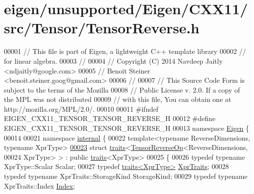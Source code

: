 \hypertarget{eigen_2unsupported_2_eigen_2_c_x_x11_2src_2_tensor_2_tensor_reverse_8h_source}{}\section{eigen/unsupported/\+Eigen/\+C\+X\+X11/src/\+Tensor/\+Tensor\+Reverse.h}
\label{eigen_2unsupported_2_eigen_2_c_x_x11_2src_2_tensor_2_tensor_reverse_8h_source}

\begin{DoxyCode}
00001 \textcolor{comment}{// This file is part of Eigen, a lightweight C++ template library}
00002 \textcolor{comment}{// for linear algebra.}
00003 \textcolor{comment}{//}
00004 \textcolor{comment}{// Copyright (C) 2014 Navdeep Jaitly <ndjaitly@google.com>}
00005 \textcolor{comment}{//                    Benoit Steiner <benoit.steiner.goog@gmail.com>}
00006 \textcolor{comment}{//}
00007 \textcolor{comment}{// This Source Code Form is subject to the terms of the Mozilla}
00008 \textcolor{comment}{// Public License v. 2.0. If a copy of the MPL was not distributed}
00009 \textcolor{comment}{// with this file, You can obtain one at http://mozilla.org/MPL/2.0/.}
00010 
00011 \textcolor{preprocessor}{#ifndef EIGEN\_CXX11\_TENSOR\_TENSOR\_REVERSE\_H}
00012 \textcolor{preprocessor}{#define EIGEN\_CXX11\_TENSOR\_TENSOR\_REVERSE\_H}
00013 \textcolor{keyword}{namespace }\hyperlink{namespace_eigen}{Eigen} \{
00014 
00021 \textcolor{keyword}{namespace }\hyperlink{namespaceinternal}{internal} \{
00022 \textcolor{keyword}{template}<\textcolor{keyword}{typename} ReverseDimensions, \textcolor{keyword}{typename} XprType>
\hyperlink{struct_eigen_1_1internal_1_1traits_3_01_tensor_reverse_op_3_01_reverse_dimensions_00_01_xpr_type_01_4_01_4}{00023} \textcolor{keyword}{struct }\hyperlink{struct_eigen_1_1internal_1_1traits}{traits}<\hyperlink{class_eigen_1_1_tensor_reverse_op}{TensorReverseOp}<ReverseDimensions,
00024                               XprType> > : \textcolor{keyword}{public} \hyperlink{struct_eigen_1_1internal_1_1traits}{traits}<XprType>
00025 \{
00026   \textcolor{keyword}{typedef} \textcolor{keyword}{typename} XprType::Scalar Scalar;
00027   \textcolor{keyword}{typedef} \hyperlink{struct_eigen_1_1internal_1_1traits}{traits<XprType>} \hyperlink{struct_eigen_1_1internal_1_1traits}{XprTraits};
00028   \textcolor{keyword}{typedef} \textcolor{keyword}{typename} XprTraits::StorageKind StorageKind;
00029   \textcolor{keyword}{typedef} \textcolor{keyword}{typename} XprTraits::Index \hyperlink{namespace_eigen_a62e77e0933482dafde8fe197d9a2cfde}{Index};

\end{DoxyCode}
